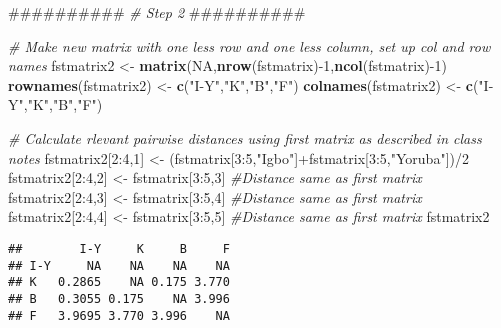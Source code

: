 \documentclass[]{article}
\newenvironment{Shaded}{\begin{snugshade}}{\end{snugshade}}
\newcommand{\KeywordTok}[1]{\textcolor[rgb]{0.13,0.29,0.53}{\textbf{{#1}}}}
\newcommand{\DecValTok}[1]{\textcolor[rgb]{0.00,0.00,0.81}{{#1}}}
\newcommand{\StringTok}[1]{\textcolor[rgb]{0.31,0.60,0.02}{{#1}}}
\newcommand{\CommentTok}[1]{\textcolor[rgb]{0.56,0.35,0.01}{\textit{{#1}}}}
\newcommand{\OtherTok}[1]{\textcolor[rgb]{0.56,0.35,0.01}{{#1}}}
\newcommand{\NormalTok}[1]{{#1}}
\begin{document}
\begin{Shaded}
\begin{Highlighting}[]
\NormalTok{##########}
\CommentTok{# Step 2}
\NormalTok{##########}

\CommentTok{# Make new matrix with one less row and one less column, set up col and row names}
\NormalTok{fstmatrix2 <-}\StringTok{ }\KeywordTok{matrix}\NormalTok{(}\OtherTok{NA}\NormalTok{,}\KeywordTok{nrow}\NormalTok{(fstmatrix)-}\DecValTok{1}\NormalTok{,}\KeywordTok{ncol}\NormalTok{(fstmatrix)-}\DecValTok{1}\NormalTok{)}
\KeywordTok{rownames}\NormalTok{(fstmatrix2) <-}\StringTok{ }\KeywordTok{c}\NormalTok{(}\StringTok{"I-Y"}\NormalTok{,}\StringTok{"K"}\NormalTok{,}\StringTok{"B"}\NormalTok{,}\StringTok{"F"}\NormalTok{)}
\KeywordTok{colnames}\NormalTok{(fstmatrix2) <-}\StringTok{ }\KeywordTok{c}\NormalTok{(}\StringTok{"I-Y"}\NormalTok{,}\StringTok{"K"}\NormalTok{,}\StringTok{"B"}\NormalTok{,}\StringTok{"F"}\NormalTok{)}

\CommentTok{# Calculate rlevant pairwise distances using first matrix as described in class notes}
\NormalTok{fstmatrix2[}\DecValTok{2}\NormalTok{:}\DecValTok{4}\NormalTok{,}\DecValTok{1}\NormalTok{] <-}\StringTok{ }\NormalTok{(fstmatrix[}\DecValTok{3}\NormalTok{:}\DecValTok{5}\NormalTok{,}\StringTok{"Igbo"}\NormalTok{]+fstmatrix[}\DecValTok{3}\NormalTok{:}\DecValTok{5}\NormalTok{,}\StringTok{"Yoruba"}\NormalTok{])/}\DecValTok{2}
\NormalTok{fstmatrix2[}\DecValTok{2}\NormalTok{:}\DecValTok{4}\NormalTok{,}\DecValTok{2}\NormalTok{] <-}\StringTok{ }\NormalTok{fstmatrix[}\DecValTok{3}\NormalTok{:}\DecValTok{5}\NormalTok{,}\DecValTok{3}\NormalTok{] }\CommentTok{#Distance same as first matrix}
\NormalTok{fstmatrix2[}\DecValTok{2}\NormalTok{:}\DecValTok{4}\NormalTok{,}\DecValTok{3}\NormalTok{] <-}\StringTok{ }\NormalTok{fstmatrix[}\DecValTok{3}\NormalTok{:}\DecValTok{5}\NormalTok{,}\DecValTok{4}\NormalTok{] }\CommentTok{#Distance same as first matrix}
\NormalTok{fstmatrix2[}\DecValTok{2}\NormalTok{:}\DecValTok{4}\NormalTok{,}\DecValTok{4}\NormalTok{] <-}\StringTok{ }\NormalTok{fstmatrix[}\DecValTok{3}\NormalTok{:}\DecValTok{5}\NormalTok{,}\DecValTok{5}\NormalTok{] }\CommentTok{#Distance same as first matrix}
\NormalTok{fstmatrix2}
\end{Highlighting}
\end{Shaded}

\begin{verbatim}
##        I-Y     K     B     F
## I-Y     NA    NA    NA    NA
## K   0.2865    NA 0.175 3.770
## B   0.3055 0.175    NA 3.996
## F   3.9695 3.770 3.996    NA
\end{verbatim}
\end{document}
